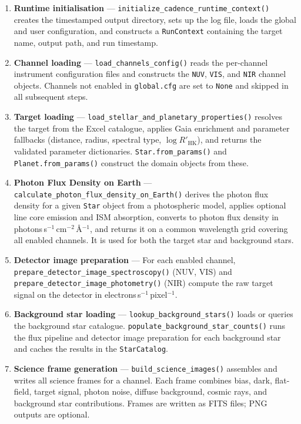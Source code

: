 \begin{enumerate}

    \item \textbf{Runtime initialisation} --- \texttt{initialize\_cadence\_runtime\_context()} creates the timestamped output directory, sets up the log file, loads the global and user configuration, and constructs a \texttt{RunContext} containing the target name, output path, and run timestamp.

    \item \textbf{Channel loading} --- \texttt{load\_channels\_config()} reads the per-channel instrument configuration files and constructs the \texttt{NUV}, \texttt{VIS}, and \texttt{NIR} channel objects. Channels not enabled in \texttt{global.cfg} are set to \texttt{None} and skipped in all subsequent steps.

    \item \textbf{Target loading} --- \texttt{load\_stellar\_and\_planetary\_properties()} resolves the target from the Excel catalogue, applies Gaia enrichment and parameter fallbacks (distance, radius, spectral type, $\log R'_{\mathrm{HK}}$), and returns the validated parameter dictionaries. \texttt{Star.from\_params()} and \texttt{Planet.from\_params()} construct the domain objects from these.

    \item \textbf{Photon Flux Density on Earth} --- \texttt{calculate\_photon\_flux\_density\_on\_Earth()} derives the photon flux density for a given \texttt{Star} object from a photospheric model, applies optional line core emission and ISM absorption, converts to photon flux density in photons\,s$^{-1}$\,cm$^{-2}$\,\AA$^{-1}$, and returns it on a common wavelength grid covering all enabled channels. It is used for both the target star and background stars.

    \item \textbf{Detector image preparation} --- For each enabled channel, \texttt{prepare\_detector\_image\_spectroscopy()} (NUV, VIS) and \texttt{prepare\_detector\_image\_photometry()} (NIR) compute the raw target signal on the detector in electrons\,s$^{-1}$\,pixel$^{-1}$.

    \item \textbf{Background star loading} --- \texttt{lookup\_background\_stars()} loads or queries the background star catalogue. \texttt{populate\_background\_star\_counts()} runs the flux pipeline and detector image preparation for each background star and caches the results in the \texttt{StarCatalog}.

    \item \textbf{Science frame generation} --- \texttt{build\_science\_images()} assembles and writes all science frames for a channel. Each frame combines bias, dark, flat-field, target signal, photon noise, diffuse background, cosmic rays, and background star contributions. Frames are written as FITS files; PNG outputs are optional.
\end{enumerate}

